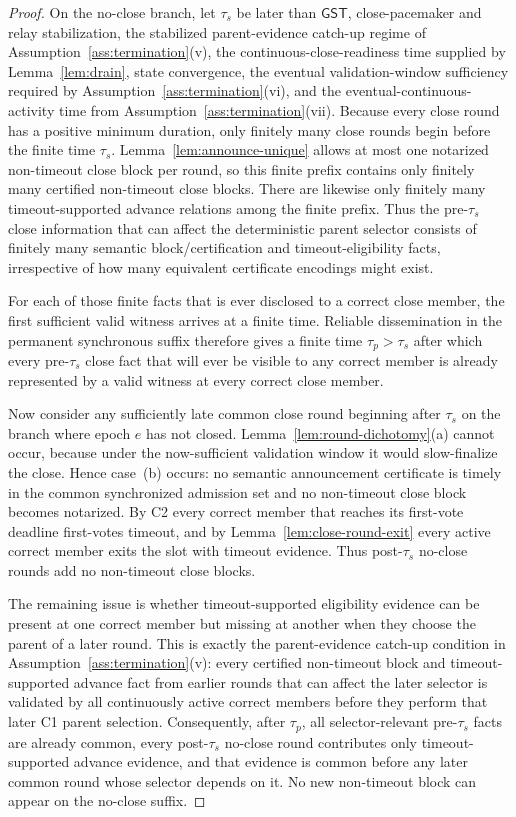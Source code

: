 \documentclass[11pt]{article}
\theoremstyle{definition}
\theoremstyle{remark}
\newcommand{\GST}{\mathsf{GST}}
\begin{document}
\begin{proof}
On the no-close branch, let $\tau_s$ be later than $\GST$, close-pacemaker and relay stabilization, the stabilized parent-evidence catch-up regime of Assumption~\ref{ass:termination}(v), the continuous-close-readiness time supplied by Lemma~\ref{lem:drain}, state convergence, the eventual validation-window sufficiency required by Assumption~\ref{ass:termination}(vi), and the eventual-continuous-activity time from Assumption~\ref{ass:termination}(vii). Because every close round has a positive minimum duration, only finitely many close rounds begin before the finite time $\tau_s$. Lemma~\ref{lem:announce-unique} allows at most one notarized non-timeout close block per round, so this finite prefix contains only finitely many certified non-timeout close blocks. There are likewise only finitely many timeout-supported advance relations among the finite prefix. Thus the pre-$\tau_s$ close information that can affect the deterministic parent selector consists of finitely many semantic block/certification and timeout-eligibility facts, irrespective of how many equivalent certificate encodings might exist.

For each of those finite facts that is ever disclosed to a correct close member, the first sufficient valid witness arrives at a finite time. Reliable dissemination in the permanent synchronous suffix therefore gives a finite time $\tau_p>\tau_s$ after which every pre-$\tau_s$ close fact that will ever be visible to any correct member is already represented by a valid witness at every correct close member.

Now consider any sufficiently late common close round beginning after $\tau_s$ on the branch where epoch $e$ has not closed. Lemma~\ref{lem:round-dichotomy}(a) cannot occur, because under the now-sufficient validation window it would slow-finalize the close. Hence case~(b) occurs: no semantic announcement certificate is timely in the common synchronized admission set and no non-timeout close block becomes notarized. By C2 every correct member that reaches its first-vote deadline first-votes timeout, and by Lemma~\ref{lem:close-round-exit} every active correct member exits the slot with timeout evidence. Thus post-$\tau_s$ no-close rounds add no non-timeout close blocks.

The remaining issue is whether timeout-supported eligibility evidence can be present at one correct member but missing at another when they choose the parent of a later round. This is exactly the parent-evidence catch-up condition in Assumption~\ref{ass:termination}(v): every certified non-timeout block and timeout-supported advance fact from earlier rounds that can affect the later selector is validated by all continuously active correct members before they perform that later C1 parent selection. Consequently, after $\tau_p$, all selector-relevant pre-$\tau_s$ facts are already common, every post-$\tau_s$ no-close round contributes only timeout-supported advance evidence, and that evidence is common before any later common round whose selector depends on it. No new non-timeout block can appear on the no-close suffix.


\end{proof}
\end{document}
